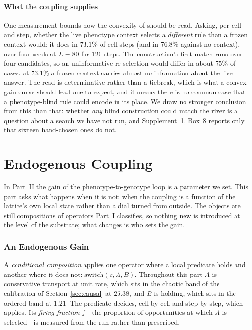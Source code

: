 \documentclass[man,12pt,floatsintext,donotrepeattitle]{apa7}
\newcommand{\secref}[1]{\emph{\nameref{#1}}}
\newcommand{\suppfindingref}[1]{Supplement~1, Box~#1}
\begin{document}
\subsection{What the coupling supplies}

One measurement bounds how the convexity of \secref{sec:gain} should be read.
Asking, per cell and step, whether the live phenotype context selects a
\emph{different} rule than a frozen context would: it does in $73.1$\% of
cell-steps (and in $76.8$\% against no context), over four seeds at $L=80$ for
$120$ steps. The construction's first-match runs over four candidates, so an
uninformative re-selection would differ in about $75$\% of cases: at $73.1$\% a
frozen context carries almost no information about the live answer. The read is
determinative rather than a tiebreak, which is what a convex gain curve should
lead one to expect, and it means there is no common case that a
phenotype-blind rule could encode in its place. We draw no stronger conclusion
from this than that: whether \emph{any} blind construction could match the
river is a question about a search we have not run, and
\suppfindingref{8} reports only that sixteen hand-chosen ones do not.

\part{Endogenous Coupling}
\label{part:endogenous}

\noindent In Part~II the gain of the phenotype-to-genotype loop is a parameter we
set. This part asks what happens when it is not: when the coupling is a function
of the lattice's own local state rather than a dial turned from outside. The
objects are still compositions of operators Part~I classifies, so nothing new is
introduced at the level of the substrate; what changes is who sets the gain.

\section{An Endogenous Gain}
\label{sec:endogenous-gain}

A \emph{conditional composition} applies one operator where a local predicate
holds and another where it does not: $\mathrm{switch}(c, A, B)$. Throughout this
part $A$ is conservative transport at unit rate, which sits in the chaotic band
of the calibration of Section~\ref{sec:causal} at $25.38$, and $B$ is
holding, which sits in the ordered band at $1.21$. The predicate decides, cell by
cell and step by step, which applies. Its \emph{firing fraction} $f$---the
proportion of opportunities at which $A$ is selected---is measured from the run
rather than prescribed.
\end{document}

